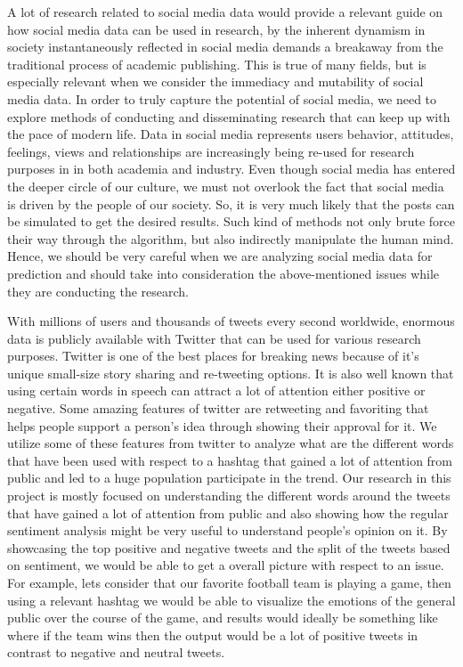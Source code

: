 A lot of research related to social media data would provide a relevant guide on how 
social media data can be used in research, by the inherent dynamism in society 
instantaneously reflected in social media demands a breakaway from the traditional 
process of academic publishing. This is true of many fields, but is especially relevant 
when we consider the immediacy and mutability of social media data. In order to 
truly capture the potential of social media, we need to explore methods of conducting 
and disseminating research that can keep up with the pace of modern life. Data in 
social media represents users behavior, attitudes, feelings, views and relationships are
increasingly being re-used for research purposes in in both academia and industry. 
Even though social media has entered the deeper circle of our culture, we must 
not overlook the fact that social media is driven by the people of our society. 
So, it is very much likely that the posts can be simulated to get the desired 
results. Such kind of methods not only brute force their way through the 
algorithm, but also indirectly manipulate the human mind. Hence, we
should be very careful when we are analyzing social media data for prediction 
and should take into consideration the above-mentioned issues while they are 
conducting the research.

With millions of users and thousands of tweets every second worldwide, enormous 
data is publicly available with Twitter that can be used for various research purposes. 
Twitter is one of the best places for breaking news because of it’s unique 
small-size story sharing and re-tweeting options. 
It is also well known that using certain words in speech can attract a lot of attention 
either positive or negative. Some amazing features of twitter are retweeting and 
favoriting that helps people support a person’s idea through showing their 
approval for it. We utilize some of these features from twitter to analyze what are the 
different words that have been used with respect to a hashtag that gained a lot of 
attention from public and led to a huge population participate in the trend. 
Our research in this project is mostly focused on understanding the different 
words around the tweets that have gained a lot of attention from public and also 
showing how the regular sentiment analysis might be very useful to understand 
people’s opinion on it. By showcasing the top positive and negative tweets and 
the split of the tweets based on sentiment, we would be able to get a overall 
picture with respect to an issue. For example, lets consider that our favorite 
football team is playing a game, then using a relevant hashtag we would be able 
to visualize the emotions of the general public over the course of the game, and 
results would ideally be something like where if the team wins then the output 
would be a lot of positive tweets in contrast to negative and neutral tweets. 


